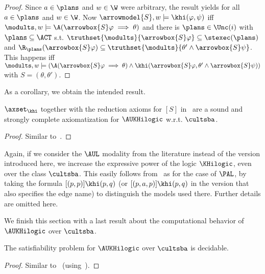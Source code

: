 \begin{proof}
	Since $a \in \plans$ and $w \in \W$ were arbitrary, the result yields for all $a \in \plans$ and $w \in \W$.
	Now $\arrowmodel{S},w \models \khi(\varphi,\psi)$ iff $\modults,w \models \A(\arrowbox{S}\varphi \implies \theta)$ and there is $\plans \in \Unc(i)$ with $\plans \subseteq \ACT$ s.t. $\truthset{\modults}{\arrowbox{S}\varphi} \subseteq \stexec(\plans)$ and $\R_\plans(\arrowbox{S}\varphi) \subseteq \truthset{\modults}{\theta' \wedge \arrowbox{S}\psi}$.
	This happens iff $\modults,w \models (\A(\arrowbox{S}\varphi \implies \theta) \wedge \khi(\arrowbox{S}\varphi,\theta' \wedge \arrowbox{S}\psi))$ with $S= (\theta,\theta')$.
\end{proof}

As a corollary, we obtain the intended result.

\medskip 

\begin{theorem}\label{th:aulcomplete}
$\axset_{\khi}$ together with the reduction axioms for $[S]$ in~ are a sound and strongly complete axiomatization for $\AUKHilogic$ w.r.t. $\cultsba$.
\end{theorem}

\begin{proof}
Similar to~.
\end{proof}

Again, if we consider the $\AUL$ modality from the literature instead of the version introduced here, we increase the expressive power of the logic $\KHilogic$, even over the class $\cultsba$. This easily follows from~ as for the case of $\PAL$, by taking the formula $[(p,p)]\khi(p,q)$ (or $[(p,a,p)]\khi(p,q)$ in the version that also specifies the edge name) to distinguish the models used there. Further details are omitted here. 


\smallskip

We finish this section with a last result about the computational behavior of $\AUKHilogic$ over $\cultsba$.

\medskip 

\begin{corollary}\label{cor:aulsat}
The satisfiability problem for $\AUKHilogic$ over $\cultsba$ is decidable.
\end{corollary}
\begin{proof}
Similar to~ (using~).
\end{proof}
